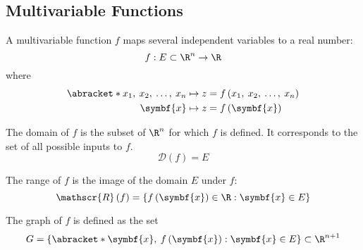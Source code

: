 \documentclass{article}
\begin{document}
\subsection{Multivariable Functions}
\begin{definition}
    A multivariable function \(f\) maps several independent variables to a real number:
    \begin{equation*}
        f : E \subset \R^n \to \R
    \end{equation*}
    where
    \begin{align*}
        \abracket*{x_1,\: x_2,\: \ldots,\: x_n} & \mapsto z = f\left( x_1,\: x_2,\: \ldots,\: x_n \right) \\
        \symbf{x}                               & \mapsto z = f\left( \symbf{x} \right)
    \end{align*}
\end{definition}
\begin{definition}[Domain]
    The domain of \(f\) is the subset of \(\R^n\) for which \(f\) is defined.
    It corresponds to the set of all possible inputs to \(f\).
    \begin{equation*}
        \mathscr{D} \left( f \right) = E
    \end{equation*}
\end{definition}
\begin{definition}[Range]
    The range of \(f\) is the image of the domain \(E\) under \(f\):
    \begin{equation*}
        \mathscr{R} \left( f \right) = \left\{ f\left( \symbf{x} \right) \in \R : \symbf{x} \in E \right\}
    \end{equation*}
\end{definition}
\begin{definition}[Graph]
    The graph of \(f\) is defined as the set
    \begin{equation*}
        G = \left\{ \abracket*{\symbf{x},\: f\left( \symbf{x} \right)} : \symbf{x} \in E \right\} \subset \R^{n + 1}
    \end{equation*}
\end{definition}
\end{document}
